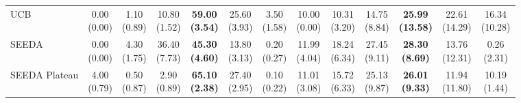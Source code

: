 \begin{table}[H]
{\begin{tabular}{l|cccccc|cccccc}
UCB & \makecell{0.00 \\ (0.00)} & \makecell{1.10 \\ (0.89)} & {\cellcolor[HTML]{C8E6C9}} \makecell{10.80 \\ (1.52)} & \bfseries \makecell{59.00 \\ (3.54)} & \makecell{25.60 \\ (3.93)} & \makecell{3.50 \\ (1.58)} & \makecell{10.00 \\ (0.00)} & \makecell{10.31 \\ (3.20)} & {\cellcolor[HTML]{C8E6C9}} \makecell{14.75 \\ (8.84)} & \bfseries \makecell{25.99 \\ (13.58)} & \makecell{22.61 \\ (14.29)} & \makecell{16.34 \\ (10.28)} \\
SEEDA & \makecell{0.00 \\ (0.00)} & \makecell{4.30 \\ (1.75)} & {\cellcolor[HTML]{C8E6C9}} \makecell{36.40 \\ (7.73)} & \bfseries \makecell{45.30 \\ (4.60)} & \makecell{13.80 \\ (3.13)} & \makecell{0.20 \\ (0.27)} & \makecell{11.99 \\ (4.04)} & \makecell{18.24 \\ (6.34)} & {\cellcolor[HTML]{C8E6C9}} \makecell{27.45 \\ (9.11)} & \bfseries \makecell{28.30 \\ (8.69)} & \makecell{13.76 \\ (12.31)} & \makecell{0.26 \\ (2.31)} \\
SEEDA Plateau & \makecell{4.00 \\ (0.79)} & \makecell{0.50 \\ (0.87)} & {\cellcolor[HTML]{C8E6C9}} \makecell{2.90 \\ (0.89)} & \bfseries \makecell{65.10 \\ (2.38)} & \makecell{27.40 \\ (2.95)} & \makecell{0.10 \\ (0.22)} & \makecell{11.01 \\ (3.08)} & \makecell{15.72 \\ (6.33)} & {\cellcolor[HTML]{C8E6C9}} \makecell{25.13 \\ (9.87)} & \bfseries \makecell{26.01 \\ (9.33)} & \makecell{11.94 \\ (11.80)} & \makecell{10.19 \\ (1.44)} \\
\bottomrule
\end{tabular}
}%
\end{table}
